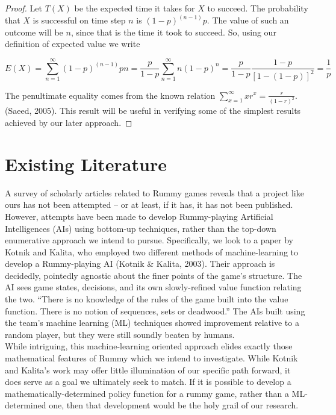 \documentclass[paper=a4, fontsize=11pt,twoside]{report}   %
\begin{document}
\begin{proof}
Let $T(X)$  be the expected time it takes for $X$ to succeed. The probability that $X$ is successful on time step $n$ is $(1−p)^(n-1) p$. The value of such an outcome will be $n$, since that is the time it took to succeed. So, using our definition of expected value we write 

$$E(X) = \sum_{n=1}^{\infty} (1-p)^{(n-1)} p n = \frac{p}{1-p} \sum_{n=1}^{\infty} n (1-p)^n =
	\frac{p}{1-p} \frac{1-p}{[1-(1-p)]^2} = \frac{1}{p} $$

The penultimate equality comes from the known relation $\sum_{x=1}^{\infty} x r^x = \frac{r}{(1-r)^2}$. (Saeed, 2005). This result will be useful in verifying some of the simplest results achieved by our later approach.

\end{proof}

\section{Existing Literature}

 A survey of scholarly articles related to Rummy games reveals that a project like ours has not been attempted – or at least, if it has, it has not been published. However, attempts have been made to develop Rummy-playing Artificial Intelligences (AIs) using bottom-up techniques, rather than the top-down enumerative approach we intend to pursue. Specifically, we look to a paper by Kotnik and Kalita, who employed two different methods of machine-learning to develop a Rummy-playing AI (Kotnik \& Kalita, 2003). Their approach is decidedly, pointedly agnostic about the finer points of the game’s structure. The AI sees game states, decisions, and its own slowly-refined value function relating the two. “There is no knowledge of the rules of the game built into the value function. There is no notion of sequences, sets or deadwood.” The AIs built using the team’s machine learning (ML) techniques showed improvement relative to a random player, but they were still soundly beaten by humans. \\

While intriguing, this machine-learning oriented approach elides exactly those mathematical features of Rummy which we intend to investigate. While Kotnik and Kalita’s work may offer little illumination of our specific path forward, it does serve as a goal we ultimately seek to match. If it is possible to develop a mathematically-determined policy function for a rummy game, rather than a ML-determined one, then that development would be the holy grail of our research.  
 
\end{document}

